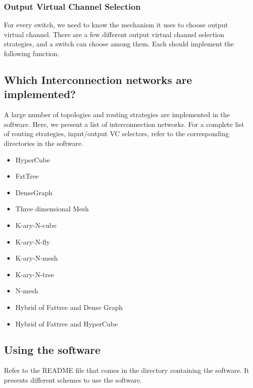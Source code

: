

\subsubsection{Output Virtual Channel Selection}
For every switch, we need to know the mechanism it uses to choose output virtual channel.
There are a few different output virtual channel selection strategies, and a switch
can choose among them. Each should implement the following function.



\subsection{Which Interconnection networks are implemented?}
A large number of topologies and routing strategies are implemented in the
software. Here, we present a list of interconnection networks. For a complete list of
routing strategies, input/output VC selectors, refer to the corresponding 
directories in the software.
\begin{itemize}
\item HyperCube
\item FatTree
\item DenseGraph
\item Three dimensional Mesh
\item K-ary-N-cube
\item K-ary-N-fly
\item K-ary-N-mesh
\item K-ary-N-tree
\item N-mesh
\item Hybrid of Fattree and Dense Graph
\item Hybrid of Fattree and HyperCube
\end{itemize}


\subsection{Using the software}
Refer to the README file that comes in the directory containing the software.
It presents different schemes to use the software.


